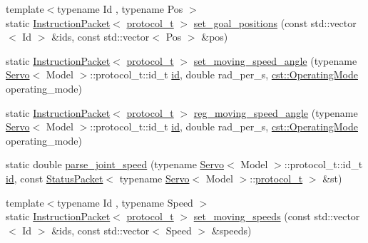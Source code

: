 \begin{DoxyCompactItemize}
\item 
{\footnotesize template$<$typename Id , typename Pos $>$ }\\static \hyperlink{classdynamixel_1_1_instruction_packet}{Instruction\+Packet}$<$ \hyperlink{classdynamixel_1_1servos_1_1_servo_a7718c41cee1187b992836f4b6bad8a38}{protocol\+\_\+t} $>$ \hyperlink{classdynamixel_1_1servos_1_1_servo_acd87b062aab514f26d8cc36ea4b01220}{set\+\_\+goal\+\_\+positions} (const std\+::vector$<$ Id $>$ \&ids, const std\+::vector$<$ Pos $>$ \&pos)
\item 
static \hyperlink{classdynamixel_1_1_instruction_packet}{Instruction\+Packet}$<$ \hyperlink{classdynamixel_1_1servos_1_1_servo_a7718c41cee1187b992836f4b6bad8a38}{protocol\+\_\+t} $>$ \hyperlink{classdynamixel_1_1servos_1_1_servo_a0dd729c0a046d759b54c5c340ba9f40e}{set\+\_\+moving\+\_\+speed\+\_\+angle} (typename \hyperlink{classdynamixel_1_1servos_1_1_servo}{Servo}$<$ Model $>$\+::protocol\+\_\+t\+::id\+\_\+t \hyperlink{classdynamixel_1_1servos_1_1_servo_a2d022081672e25a7bb57b76706e1cc57}{id}, double rad\+\_\+per\+\_\+s, \hyperlink{namespacedynamixel_1_1servos_1_1cst_ac17b5608f65c6495114d34f8efc4d809}{cst\+::\+Operating\+Mode} operating\+\_\+mode)
\item 
static \hyperlink{classdynamixel_1_1_instruction_packet}{Instruction\+Packet}$<$ \hyperlink{classdynamixel_1_1servos_1_1_servo_a7718c41cee1187b992836f4b6bad8a38}{protocol\+\_\+t} $>$ \hyperlink{classdynamixel_1_1servos_1_1_servo_ac1d6177d421eda70f0b173fb7804a6af}{reg\+\_\+moving\+\_\+speed\+\_\+angle} (typename \hyperlink{classdynamixel_1_1servos_1_1_servo}{Servo}$<$ Model $>$\+::protocol\+\_\+t\+::id\+\_\+t \hyperlink{classdynamixel_1_1servos_1_1_servo_a2d022081672e25a7bb57b76706e1cc57}{id}, double rad\+\_\+per\+\_\+s, \hyperlink{namespacedynamixel_1_1servos_1_1cst_ac17b5608f65c6495114d34f8efc4d809}{cst\+::\+Operating\+Mode} operating\+\_\+mode)
\item 
static double \hyperlink{classdynamixel_1_1servos_1_1_servo_a4eeab8a43893c98df9f3cad6cdf2a6ab}{parse\+\_\+joint\+\_\+speed} (typename \hyperlink{classdynamixel_1_1servos_1_1_servo}{Servo}$<$ Model $>$\+::protocol\+\_\+t\+::id\+\_\+t \hyperlink{classdynamixel_1_1servos_1_1_servo_a2d022081672e25a7bb57b76706e1cc57}{id}, const \hyperlink{classdynamixel_1_1_status_packet}{Status\+Packet}$<$ typename \hyperlink{classdynamixel_1_1servos_1_1_servo}{Servo}$<$ Model $>$\+::\hyperlink{classdynamixel_1_1servos_1_1_servo_a7718c41cee1187b992836f4b6bad8a38}{protocol\+\_\+t} $>$ \&st)
\item 
{\footnotesize template$<$typename Id , typename Speed $>$ }\\static \hyperlink{classdynamixel_1_1_instruction_packet}{Instruction\+Packet}$<$ \hyperlink{classdynamixel_1_1servos_1_1_servo_a7718c41cee1187b992836f4b6bad8a38}{protocol\+\_\+t} $>$ \hyperlink{classdynamixel_1_1servos_1_1_servo_a8e764c4e4bdeaf3cc89b3fb7955db62c}{set\+\_\+moving\+\_\+speeds} (const std\+::vector$<$ Id $>$ \&ids, const std\+::vector$<$ Speed $>$ \&speeds)

\end{DoxyCompactItemize}
